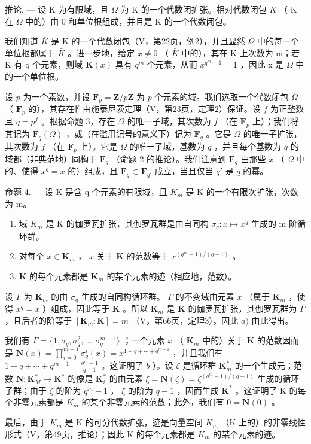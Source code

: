推论. --- 设 K 为有限域，且 \(\Omega\) 为 K 的一个代数闭扩张。相对代数闭包 \(\bar{K}\) （ K 在 \(\Omega\) 中的）由 0 和单位根组成，并且是 K 的一个代数闭包。

我们知道 \(\bar{K}\) 是 K 的一个代数闭包（V，第22页，例2），并且显然 \(\Omega\) 中的每一个单位根都属于 \(\bar{K}\) 。进一步地，给定 \(x \neq 0\) （ \(\bar{K}\) 中的），其在 K 上次数为 m；若 K 有 q 个元素，则域 \(\mathbf{K}(x)\) 具有 \(q^{m}\) 个元素，从而 \(x^{q^{m}-1} = 1\) ，因此 x 是 \(\Omega\) 中的一个单位根。

设 \(p\) 为一个素数，并设 \(\mathbf{F}_p = \mathbf{Z} / p\mathbf{Z}\) 为 \(p\) 个元素的域。我们选取一个代数闭包 \(\Omega\) （ \(\mathbf{F}_p\) 的），其存在性由施泰尼茨定理（V，第23页，定理2）保证。设 \(f\) 为正整数且 \(q = p^f\) 。根据命题 3，存在 \(\Omega\) 的唯一子域，其次数为 \(f\) （在 \(\mathbf{F}_p\) 上）；我们将其记为 \(\mathbf{F}_q(\Omega)\) ，或（在滥用记号的意义下）记为 \(\mathbf{F}_q\) 。它是 \(\Omega\) 的唯一子扩张，其次数为 \(f\) （在 \(\mathbf{F}_p\) 上）。它是 \(\Omega\) 的唯一子域，基数为 \(q\) ，并且每个基数为 \(q\) 的域都（非典范地）同构于 \(\mathbf{F}_q\) （命题 2 的推论）。我们注意到 \(\mathbf{F}_q\) 由那些 \(x\) （ \(\Omega\) 中的、使得 \(x^q = x\) 的）组成，且 \(\mathbf{F}_q \subset \mathbf{F}_{q'}\) 成立，当且仅当 \(q'\) 是 \(q\) 的幂。

命题 4. --- 设 K 是含 q 个元素的有限域，且 \(K_{m}\) 是 K 的一个有限次扩张，次数为 m。

\begin{enumerate}
\def\labelenumi{\alph{enumi})}
\item
  域 \(K_{m}\) 是 K 的伽罗瓦扩张，其伽罗瓦群是由自同构 \(\sigma_{q}: x \mapsto x^{q}\) 生成的 m 阶循环群。
\item
  对每个 \(x \in \mathbf{K}_m\) ， \(x\) 关于 \(\mathbf{K}\) 的范数等于 \(x^{(q^m - 1) / (q - 1)}\) 。
\item
  \(\mathbf{K}\) 的每个元素都是 \(\mathbf{K}_m\) 的某个元素的迹（相应地，范数）。
\end{enumerate}

设 \(\Gamma\) 为 \(\mathbf{K}_m\) 的由 \(\sigma_q\) 生成的自同构循环群。 \(\Gamma\) 的不变域由元素 \(x\) （属于 \(\mathbf{K}_m\) ，使得 \(x^q = x\) ）组成，因此等于 \(\mathbf{K}\) 。所以 \(\mathbf{K}_m\) 是 \(\mathbf{K}\) 的伽罗瓦扩张，其伽罗瓦群为 \(\Gamma\) ，且后者的阶等于 \([\mathbf{K}_m: \mathbf{K}] = m\) （V，第66页，定理3）。因此 \(a)\) 由此得出。

我们有 \(\Gamma = \{1, \sigma_q, \sigma_q^2, \ldots, \sigma_q^{m-1}\}\) ；一个元素 \(x\) （ \(\mathbf{K}_m\) 中的）关于 \(\mathbf{K}\) 的范数因而是 \(\mathbf{N}(x) = \prod_{i=0}^{m-1} \sigma_q^i(x) = x^{1+q+\cdots+q^{m-1}}\) ，并且我们有 \(1 + q + \cdots + q^{m-1} = \frac{q^m - 1}{q - 1}\) 。这证明了 \(b\) ）。设 \(\zeta\) 是循环群 \(\mathbf{K}_m^*\) 的一个生成元；范数 \(\mathbf{N}: \mathbf{K}_M^* \to \mathbf{K}^*\) 的像是 \(\mathbf{K}_i^*\) 的由元素 \(\xi = \mathbf{N}(\zeta) = \zeta^{(q^m - 1)/(q - 1)}\) 生成的循环子群；由于 \(\zeta\) 的阶为 \(q^m - 1\) ， \(\xi\) 的阶为 \(q - 1\) ，因而生成 \(\mathbf{K}^*\) 。这证明了 K 的每个非零元素都是 \(K_{m}\) 的某个非零元素的范数；此外，我们有 \(0 = \mathbf{N}(0)\) 。

最后，由于 \(K_{m}\) 是 K 的可分代数扩张，迹是向量空间 \(K_{m}\) （K 上的）的非零线性形式（V，第49页，推论）；因此 K 的每个元素都是 \(K_{m}\) 的某个元素的迹。
